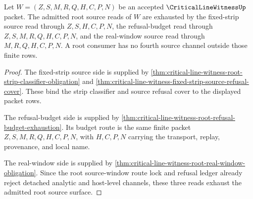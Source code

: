 \begin{theorem}
\label{thm:critical-line-witness-fixed-strip-budget-source-totality}
Let $W=(Z,S,M,R,Q,H,C,P,N)$ be an accepted $\CriticalLineWitnessUp$ packet. The admitted root source reads of $W$ are exhausted by the fixed-strip source read through $Z,S,H,C,P,N$, the refusal-budget read through $Z,S,M,R,Q,H,C,P,N$, and the real-window source read through $M,R,Q,H,C,P,N$. A root consumer has no fourth source channel outside those finite rows.
\end{theorem}
\begin{proof}
The fixed-strip source side is supplied by \autoref{thm:critical-line-witness-root-strip-classifier-obligation} and \autoref{thm:critical-line-witness-fixed-strip-source-refusal-cover}. These bind the strip classifier and source refusal cover to the displayed packet rows.

The refusal-budget side is supplied by \autoref{thm:critical-line-witness-root-refusal-budget-exhaustion}. Its budget route is the same finite packet $Z,S,M,R,Q,H,C,P,N$, with $H,C,P,N$ carrying the transport, replay, provenance, and local name.

The real-window side is supplied by \autoref{thm:critical-line-witness-root-real-window-obligation}. Since the root source-window route lock and refusal ledger already reject detached analytic and host-level channels, these three reads exhaust the admitted root source surface.
\end{proof}

